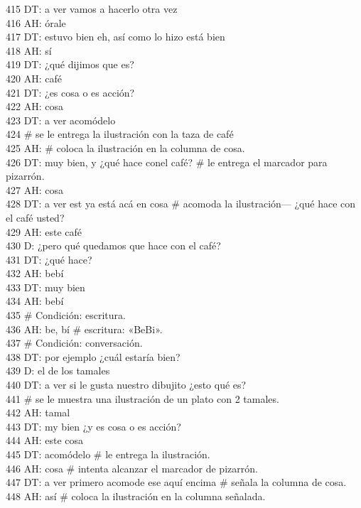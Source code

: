 415 DT: a ver vamos a hacerlo otra vez\\
416 AH: órale\\
417 DT: estuvo bien eh, así como lo hizo está bien\\
418 AH: sí\\
419 DT: ¿qué dijimos que es?\\
420 AH: café\\
421 DT: ¿es cosa o es acción?\\
422 AH: cosa\\
423 DT: a ver acomódelo\\
424 \# se le entrega la ilustración con la taza de café\\
425 AH: \# coloca la ilustración en la columna de cosa.\\
426 DT: muy bien, y ¿qué hace conel café? \# le entrega el marcador para pizarrón.\\
427 AH: cosa\\
428 DT: a ver est ya está acá en cosa \# acomoda la ilustración--- ¿qué hace con el café usted?\\
429 AH: este café\\
430 D: ¿pero qué quedamos que hace con el café?\\
431 DT: ¿qué hace?\\
432 AH: bebí\\
433 DT: muy bien\\
434 AH: bebí\\
435 \# Condición: escritura.\\
436 AH: be, bí \# escritura: «BeBi».\\
437 \# Condición: conversación.\\
438 DT: por ejemplo ¿cuál estaría bien?\\
439 D: el de los tamales\\
440 DT: a ver si le gusta nuestro dibujito ¿esto qué es?\\
441 \# se le muestra una ilustración de un plato con 2 tamales.\\
442 AH: tamal\\
443 DT: my bien ¿y es cosa o es acción?\\
444 AH: este cosa\\
445 DT: acomódelo \# le entrega la ilustración.\\
446 AH: cosa \# intenta alcanzar el marcador de pizarrón.\\
447 DT: a ver primero acomode ese aquí encima \# señala la columna de cosa.\\
448 AH: así \# coloca la ilustración en la columna señalada.\\
